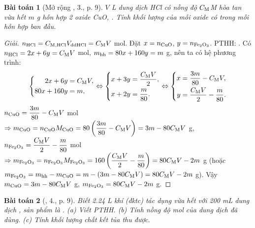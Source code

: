 \documentclass{article}
\newtheorem{baitoan}{Bài toán}
\begin{document}
\begin{baitoan}[Mở rộng \cite{SGK_Hoa_Hoc_9}, 3., p. 9]
	$V$ \emph{L} dung dịch \emph{HCl} có nồng độ $C_{\rm M}$\emph{M} hòa tan vừa hết $m$ \emph{g} hỗn hợp 2 oxide \emph{CuO, }. Tính khối lượng của mỗi oxide có trong mỗi hỗn hợp ban đầu.
\end{baitoan}

\begin{proof}[Giải]
	$n_{\rm HCl} = C_{\rm M,HCl}V_{\rm ddHCl} = C_{\rm M}V$ mol. Đặt $x = n_{\rm CuO}$, $y = n_{\ce{Fe2O3}}$. PTHH: . Có $n_{\rm HCl} = 2x + 6y = C_{\rm M}V$ mol, $m_{\rm hh} = 80x + 160y = m$ g, nên ta có hệ phương trình:
	\begin{equation*}
		\left\{\begin{split}
			2x + 6y &= C_{\rm M}V,\\
			80x + 160y &= m,
		\end{split}\right.\Leftrightarrow\left\{\begin{split}
			x + 3y &= \frac{C_{\rm M}V}{2},\\
			x + 2y &= \frac{m}{80}.
		\end{split}\right.\Leftrightarrow\left\{\begin{split}
			x &= \frac{3m}{80} - C_{\rm M}V,\\
			y &= \frac{C_{\rm M}V}{2} - \frac{m}{80}.
		\end{split}\right.
	\end{equation*}
	$n_{\rm CuO} = \dfrac{3m}{80} - C_{\rm M}V$ mol $\Rightarrow m_{\rm CuO} = n_{\rm CuO}M_{\rm CuO} = 80\left(\dfrac{3m}{80} - C_{\rm M}V\right) = 3m - 80C_{\rm M}V$ g, $n_{\ce{Fe2O3}} = \dfrac{C_{\rm M}V}{2} - \dfrac{m}{80}$ mol $\Rightarrow m_{\ce{Fe2O3}} = n_{\ce{Fe2O3}}M_{\ce{Fe2O3}} = 160\left(\dfrac{C_{\rm M}V}{2} - \dfrac{m}{80}\right) = 80C_{\rm M}V - 2m$ g (hoặc $m_{\ce{Fe2O3}} = m_{\rm hh} - m_{\rm CuO} = m - (3m - 80C_{\rm M}V) = 80C_{\rm M}V - 2m$ g). Vậy $m_{\rm CuO} = 3m - 80C_{\rm M}V$ g, $m_{\ce{Fe2O3}} = 80C_{\rm M}V - 2m$ g.
\end{proof}

\begin{baitoan}[\cite{SGK_Hoa_Hoc_9}, 4., p. 9]
	Biết \emph{2.24 L} khí \emph{} (đktc) tác dụng vừa hết với \emph{200 mL} dung dịch \emph{}, sản phẩm là \emph{}. (a) Viết PTHH. (b) Tính nồng độ mol của dung dịch \emph{} đã dùng. (c) Tính khối lượng chất kết tủa thu được.
\end{baitoan}
\end{document}
